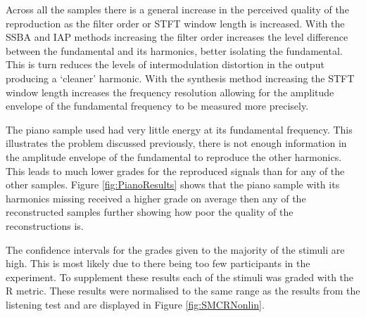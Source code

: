 		Across all the samples there is a general increase in the perceived quality of the reproduction as the
		filter order or STFT window length is increased. With the SSBA and IAP methods increasing the filter order
		increases the level difference between the fundamental and its harmonics, better isolating the fundamental.
		This is turn reduces the levels of intermodulation distortion in the output producing a `cleaner' harmonic.
		With the synthesis method increasing the STFT window length increases the frequency resolution allowing for
		the amplitude envelope of the fundamental frequency to be measured more precisely.

		The piano sample used had very little energy at its fundamental frequency. This illustrates the problem
		discussed previously, there is not enough information in the amplitude envelope of the fundamental to
		reproduce the other harmonics. This leads to much lower grades for the reproduced signals than for any of
		the other samples. Figure \ref{fig:PianoResults} shows that the piano sample with its harmonics
		missing received a higher grade on average then any of the reconstructed samples further showing how poor
		the quality of the reconstructions is.

		The confidence intervals for the grades given to the majority of the stimuli are high. This is most likely
		due to there being too few participants in the experiment. To supplement these results each of the stimuli
		was graded with the R metric. These results were normalised to the same range as the results
		from the listening test and are displayed in Figure \ref{fig:SMCRNonlin}.

